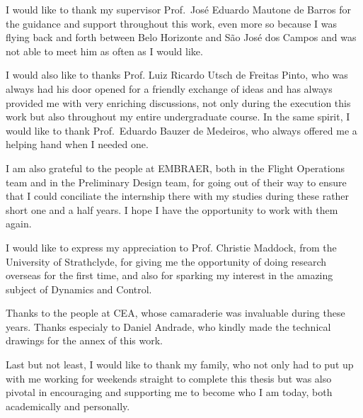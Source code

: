 \begin{agradecimentos}

    I would like to thank my supervisor Prof.\ José Eduardo Mautone de Barros for
    the guidance and support throughout this work, even more so because I was
    flying back and forth between Belo Horizonte and  São José dos Campos 
    and was not able to meet him as often as I would like.

    I would also like to thanks Prof. Luiz Ricardo Utsch de Freitas Pinto, who was
    always had his door opened for a friendly exchange of ideas and has always provided
    me with very enriching discussions, not only during the execution this work
    but also throughout my entire undergraduate course.  In the same spirit, I
    would like to thank Prof.\ Eduardo Bauzer de Medeiros, who always offered
    me a helping hand when I needed one.

    I am also grateful to the people at EMBRAER, both in the Flight Operations
    team and in the Preliminary Design team, for going out of their
    way to ensure that I could conciliate the internship there with my studies
    during these rather short one and a half years. I
    hope I have the opportunity to work with them again.

    I would like to express my appreciation to Prof. Christie Maddock, from the
    University of Strathclyde, for giving me the opportunity of doing research overseas for the first time,
    and also for sparking my interest in the amazing subject of Dynamics and Control.

    Thanks to the people at CEA, whose camaraderie was invaluable during these years. 
    Thanks especialy to Daniel Andrade, who kindly made the technical drawings 
    for the annex of this work.

    Last but not least, I would like to thank my family, who not only had to put up
    with me working for weekends straight to complete this thesis but was also
    pivotal in encouraging and supporting me to become who I am today, both
    academically and personally. 

\end{agradecimentos}

